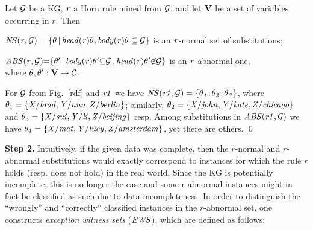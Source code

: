 \begin{definition}\label{sec:rulelearn}
Let $\mathcal{G}$ be a KG, $\mathit{r}$ a Horn rule mined from $\mathcal{G}$, and let ${\mathbf V}$ be a set of variables occurring in $r$. Then
\begin{myitemize}
\item $\mathit{NS(r, \mathcal{G})=\{\theta\, |\, head(r)\theta,body(r)\theta \subseteq \mathcal{G}\}}$ is an $\mathit{r}$-normal set of substitutions;
\item $\mathit{ABS(r, \mathcal{G}){=}\{\theta'\, |\, body(r)\theta' {\subseteq} \mathcal{G}\,{,}\,head(r)\theta' {\not \in} \mathcal{G}\}}$ is an $\mathit{r}$-abnormal one, \\
where $\theta,\theta':{\mathbf V} \rightarrow \mathcal{C}$.
\end{myitemize} 
\end{definition}

\begin{example}\label{ex:abns}
For $\mathcal{G}$ from Fig.~\ref{rdf} and $\mathit{r1}$ 
we have $\mathit{NS(r1,\mathcal{G})}=\{\mathit{\theta_1,\theta_2,\theta_3}\}$, where $\theta_1=\{\mathit{X/brad,Y/ann,Z/berlin}\}$; similarly, $\theta_2=\{\mathit{X/john,Y/kate,Z/chicago}\}$ and $\theta_3=\{\mathit{X/sui,Y/li,Z/beijing}\}$ resp. Among substitutions in $\mathit{ABS(r1,\mathcal{G})}$ we have $\theta_4=\{\mathit{X/mat,Y/lucy,Z/amsterdam}\}$, yet there are others. \qed 
\end{example}
 


\noindent \textbf{Step 2.} Intuitively, if the given data was complete, then the $r$-normal
and $r$-abnormal substitutions would exactly correspond to instances for which
the rule $r$ holds (resp. does not hold) in the real world. Since the KG is
potentially incomplete, this is no longer the case and some r-abnormal instances
might in fact be classified as such due to data incompleteness.  In order to
distinguish the ``wrongly'' and ``correctly'' classified instances in the
$r$-abnormal set, one constructs \emph{exception witness sets} ($\mathit{EWS}$), which
are defined as follows:



